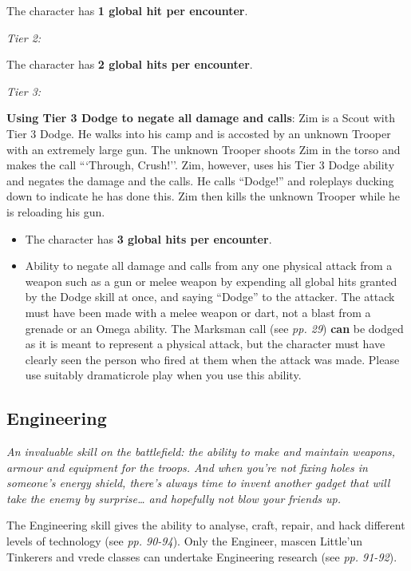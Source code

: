 \documentclass{scrbook}
\begin{document}
The character has \textbf{1 global hit per encounter}.

\textit{Tier 2:}

The character has \textbf{2 global hits per encounter}.

\textit{Tier 3:}

\textbf{Using Tier 3 Dodge to negate all damage and calls}: Zim is a Scout with Tier 3 Dodge. He walks into his camp and is accosted by an unknown Trooper with an extremely large gun. The unknown Trooper shoots Zim in the torso and makes the call ```Through, Crush!''. Zim, however, uses his Tier 3 Dodge ability and negates the damage and the calls. He calls ``Dodge!'' and roleplays ducking down to indicate he has done this. Zim then kills the unknown Trooper while he is reloading his gun.

\begin{itemize}
\item The character has \textbf{3 global hits per encounter}.

\item Ability to negate all damage and calls from any one physical attack from a weapon such as a gun or melee weapon by expending all global hits granted by the Dodge skill at once, and saying ``Dodge'' to the attacker. The attack must have been made with a melee weapon or dart, not a blast from a grenade or an Omega ability. The Marksman call (see \textit{pp. 29}) \textbf{can} be dodged as it is meant to represent a physical attack, but the character must have clearly seen the person who fired at them when the attack was made. Please use suitably dramaticrole play when you use this ability.

\end{itemize}
\subsection{Engineering}

\textit{An invaluable skill on the battlefield: the ability to make and maintain weapons, armour and equipment for the troops. And when you're not fixing holes in someone's energy shield, there's always time to invent another gadget that will take the enemy by surprise{\dots} and hopefully not blow your friends up.}

The Engineering skill gives the ability to analyse, craft, repair, and hack different levels of technology (see \textit{pp. 90-94}). Only the Engineer, mascen Little'un Tinkerers and vrede classes can undertake Engineering research (see \textit{pp. 91-92}).
\end{document}
